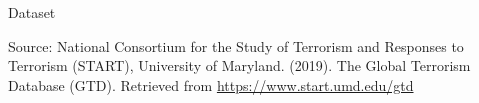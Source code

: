 \documentclass{beamer}
\begin{document}
\begin{frame}{Dataset}
\begin{figure}
    \hspace*{-25px}
    \centering
\end{figure}
{\footnotesize Source: National Consortium for the Study of Terrorism and Responses to Terrorism (START), University of Maryland. (2019). The Global Terrorism Database (GTD). Retrieved from \url{https://www.start.umd.edu/gtd} }
\end{frame}
\end{document}
